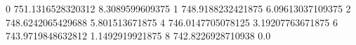 0 751.1316528320312 8.3089599609375
1 748.9188232421875 6.09613037109375
2 748.6242065429688 5.801513671875
4 746.0147705078125 3.19207763671875
6 743.9719848632812 1.1492919921875
8 742.8226928710938 0.0
